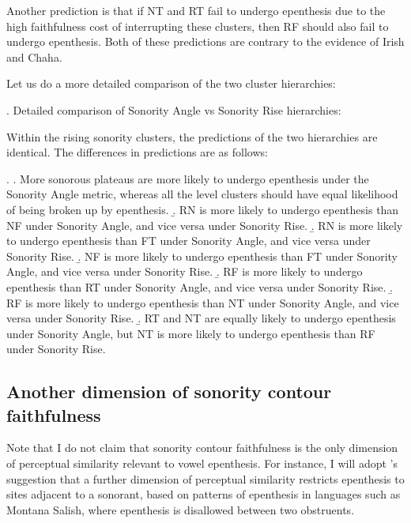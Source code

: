 \documentclass[12pt]{article}
\begin{document}
Another prediction is that if NT and RT fail to undergo epenthesis due to the high faithfulness cost of interrupting these clusters, then RF should also fail to undergo epenthesis. Both of these predictions are contrary to the evidence of Irish and Chaha.

Let us do a more detailed comparison of the two cluster hierarchies:

\ex. Detailed comparison of {\sc Sonority Angle} vs {\sc Sonority Rise} hierarchies:

\noindent \resizebox{\linewidth}{!}{\usebox{\sonorityanglehierarchycompressed}}

\vspace{-2em}
\noindent \resizebox{\linewidth}{!}{\usebox{\sonorityrisehierarchycompressed}}

Within the rising sonority clusters, the predictions of the two hierarchies are identical.
The differences in predictions are as follows:

\ex. \a. More sonorous plateaus are more likely to undergo epenthesis under the {\sc Sonority Angle} metric, whereas all the level clusters should have equal likelihood of being broken up by epenthesis.
     \b. RN is more likely to undergo epenthesis than NF under {\sc Sonority Angle}, and vice versa under {\sc Sonority Rise}.
     \b. RN is more likely to undergo epenthesis than FT under {\sc Sonority Angle}, and vice versa under {\sc Sonority Rise}.
     \b. NF is more likely to undergo epenthesis than FT under {\sc Sonority Angle}, and vice versa under {\sc Sonority Rise}.
     \b. RF is more likely to undergo epenthesis than RT under {\sc Sonority Angle}, and vice versa under {\sc Sonority Rise}.
     \b. RF is more likely to undergo epenthesis than NT under {\sc Sonority Angle}, and vice versa under {\sc Sonority Rise}.
     \b. RT and NT are equally likely to undergo epenthesis under {\sc Sonority Angle}, but NT is more likely to undergo epenthesis than RF under {\sc Sonority Rise}.

\subsection{Another dimension of sonority contour faithfulness} \label{depson}

Note that I do not claim that sonority contour faithfulness is the only dimension of perceptual similarity relevant to vowel epenthesis. For instance, I will adopt \citet{flemming.2008}'s suggestion that a further dimension of perceptual similarity restricts epenthesis to sites adjacent to a sonorant, based on patterns of epenthesis in languages such as Montana Salish, where epenthesis is disallowed between two obstruents. 
\end{document}
